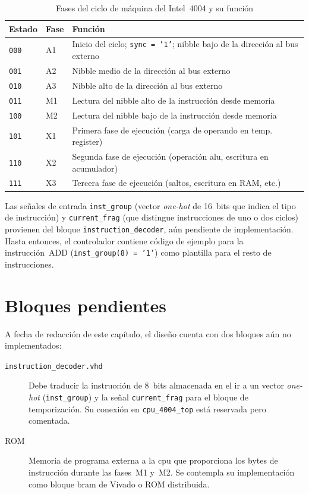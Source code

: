 \documentclass[%
    school=etsisi,%
    type=pfg,%
    degree=61CI,%
]{upm-report}
\begin{document}
\begin{table}[H]
\centering
\caption{Fases del ciclo de máquina del Intel~4004 y su función}
\label{tab:fases}
\begin{tabularx}{\textwidth}{@{}llX@{}}
\toprule
\textbf{Estado} & \textbf{Fase} & \textbf{Función} \\
\midrule
\texttt{000} & A1 & Inicio del ciclo; \texttt{sync = '1'}; nibble bajo de la dirección al bus externo \\
\texttt{001} & A2 & Nibble medio de la dirección al bus externo \\
\texttt{010} & A3 & Nibble alto de la dirección al bus externo \\
\texttt{011} & M1 & Lectura del nibble alto de la instrucción desde memoria \\
\texttt{100} & M2 & Lectura del nibble bajo de la instrucción desde memoria \\
\texttt{101} & X1 & Primera fase de ejecución (carga de operando en temp. register) \\
\texttt{110} & X2 & Segunda fase de ejecución (operación \acrshort{alu}, escritura en acumulador) \\
\texttt{111} & X3 & Tercera fase de ejecución (saltos, escritura en RAM, etc.) \\
\bottomrule
\end{tabularx}
\end{table}

Las señales de entrada \texttt{inst\_group} (vector \textit{one-hot} de
16~bits que indica el tipo de instrucción) y \texttt{current\_frag}
(que distingue instrucciones de uno o dos ciclos) provienen del bloque
\texttt{instruction\_decoder}, aún pendiente de implementación.  Hasta
entonces, el controlador contiene código de ejemplo para la instrucción~ADD
(\texttt{inst\_group(8) = '1'}) como plantilla para el resto de instrucciones.

\section{Bloques pendientes}
\label{s:pendientes}

A fecha de redacción de este capítulo, el diseño cuenta con dos bloques aún
no implementados:

\begin{description}
    \item[\texttt{instruction\_decoder.vhd}] Debe traducir la instrucción de
        8~bits almacenada en el \acrshort{ir} a un vector \textit{one-hot}
        (\texttt{inst\_group}) y la señal \texttt{current\_frag} para el
        bloque de temporización.  Su conexión en \texttt{cpu\_4004\_top}
        está reservada pero comentada.

    \item[ROM] Memoria de programa externa a la \acrshort{cpu} que
        proporciona los bytes de instrucción durante las fases~M1 y~M2.
        Se contempla su implementación como bloque \acrshort{bram} de
        Vivado o ROM distribuida.
\end{description}
\end{document}
